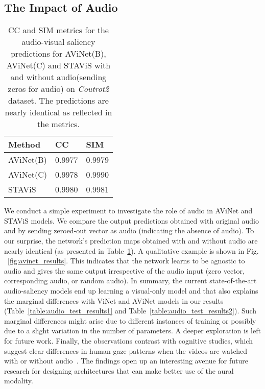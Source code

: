 \documentclass[letterpaper, 10 pt, conference]{ieeeconf}  \usepackage{times}
\begin{document}
\subsection{The Impact of Audio}
\begin{table}[]
\begin{center}
    

\begin{tabular}{@{}lll@{}}
\toprule
Method    & CC & SIM \\ \midrule
AViNet(B) &  0.9977  & 0.9979    \\
AViNet(C) & 0.9978   & 0.9990    \\
STAViS &  0.9980  & 0.9981      \\ \bottomrule
\end{tabular}
\end{center}
\caption{CC and SIM metrics for the audio-visual saliency predictions for AViNet(B), AViNet(C) and STAViS with and without audio(sending zeros for audio) on \emph{Coutrot2} dataset. The predictions are nearly identical as reflected in the metrics.  }
\label{table:with_without_audio}
\vspace{-1.5em}
\end{table}
We conduct a simple experiment to investigate the role of audio in AViNet and STAViS models. We compare the output predictions obtained with original audio and by sending zeroed-out vector as audio (indicating the absence of audio). To our surprise, the network's prediction maps obtained with and without audio are nearly identical (as presented in Table~\ref{table:with_without_audio}). A qualitative example is shown in Fig. ~\ref{fig:avinet_results}. This indicates that the network learns to be agnostic to audio and gives the same output irrespective of the audio input (zero vector, corresponding audio, or random audio). In summary, the current state-of-the-art audio-saliency models end up learning a visual-only model and that also explains the marginal differences with ViNet and AViNet models in our results (Table~\ref{table:audio_test_results1} and Table~\ref{table:audio_test_results2}). Such marginal differences might arise due to different instances of training or possibly due to a slight variation in the number of parameters. A deeper exploration is left for future work. Finally, the observations contrast with cognitive studies, which suggest clear differences in human gaze patterns when the videos are watched with or without audio~\cite{coutrot2012influence}. The findings open up an interesting avenue for future research for designing architectures that can make better use of the aural modality. 
\end{document}
